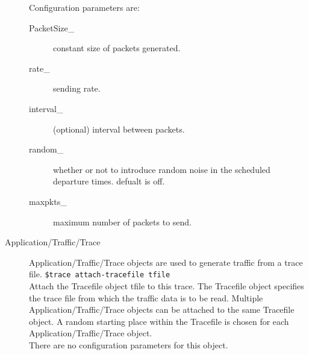 \begin{description}
Configuration parameters are:
\begin{description}
\item[PacketSize\_] constant size of packets generated. 
\item[rate\_] sending rate.
\item[interval\_] (optional) interval between packets.
\item[random\_] whether or not to introduce random noise in the scheduled
departure times. defualt is off.
\item[maxpkts\_] maximum number of packets to send.
\end{description}

\item[Application/Traffic/Trace]
Application/Traffic/Trace objects are used to generate traffic from a
trace file. 
{\tt \$trace attach-tracefile tfile}\\
Attach the Tracefile object tfile to this trace. The Tracefile object
specifies the trace file from which the traffic data is to be read.
Multiple Application/Traffic/Trace objects can be attached
to the same Tracefile object. A random starting place within the Tracefile
is chosen for each Application/Traffic/Trace object. \\

There are no configuration parameters for this object. 
\end{description}

